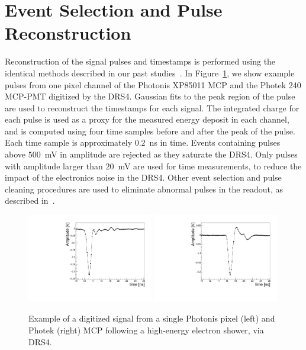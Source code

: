 \documentclass[12pt]{article}
\begin{document}
{\section{Event Selection and Pulse Reconstruction}
\label{sec:reconstruction}
Reconstruction of the signal pulses and timestamps is performed using the
identical methods described in our past
studies~\cite{Anderson:2015gha,MCPFastCaloNIMA,Ronzhin:2015pba,MCPShowerMaxPaper}.
In Figure~\ref{fig:expulse}, we show example pulses from one pixel channel of
the Photonis XP85011 MCP and the Photek 240 MCP-PMT digitized by the DRS4.
Gaussian fits to the peak region of the pulse are used to reconstruct the
timestamps for each signal. The integrated charge for each pulse is used as a
proxy for the measured energy deposit in each channel, and is computed using
four time samples before and after the peak of the pulse. Each time sample is
approximately $0.2$~ns in time. Events containing pulses above $500$~mV in
amplitude are rejected as they saturate the DRS4. Only pulses with amplitude
larger than $20$~mV are used for time measurements, to reduce the impact of the
electronics noise in the DRS4. Other event selection and pulse cleaning
procedures are used to eliminate abnormal pulses in the readout, as described
in~\cite{MCPFastCaloNIMA}. 
\begin{figure}[htbp]
	\centering
	\includegraphics[width=0.49\textwidth]{Images/expulse/pulsepix_30_2_12.pdf}
	\includegraphics[width=0.49\textwidth]{Images/expulse/pulseref_30_2_10.pdf}
	\caption{\small Example of a digitized signal from a single Photonis pixel
(left) and Photek (right) MCP following a high-energy electron shower, via DRS4.}
	\label{fig:expulse}
\end{figure}
}
\end{document}
